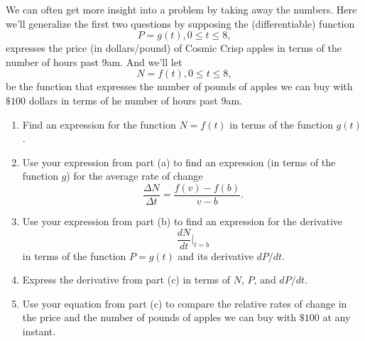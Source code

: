\documentclass{ximera}
\begin{document}
\begin{question}  \label{Qopdfpdsgnbhtr}
We can often get more insight into a problem by taking away the numbers. Here we'll generalize the first two questions by supposing the (differentiable) function
\[
         P = g(t) , 0\leq t \leq 8 ,
\]
expresses the price (in dollars/pound) of Cosmic Crisp apples in terms of the number of hours past 9am. And we'll let
\[
          N = f(t) , 0\leq t \leq 8 ,
\]
be the function that expresses the number of pounds of apples we can buy with $\$100$ dollars in terms of he number of hours past 9am.

\begin{enumerate}
\item Find an expression for the function $N=f(t)$ in terms of the function $g(t)$.

\item Use your expression from part (a) to find an expression (in terms of the function $g$) for the average rate of change
\[
 \frac{\Delta N}{\Delta t} = \frac{f(v)-f(b)}{v-b} .
\]

\item Use your expression from part (b) to find an expression for the derivative
\[
  \frac{dN}{dt}\Big|_{t=b} 
\]
in terms of the function $P=g(t)$ and its derivative $dP/dt$.

\item Express the derivative from part (c) in terms of $N$, $P$, and $dP/dt$.

\item Use your equation from part (c) to compare the  relative rates of change in the price and the number of pounds of apples we can buy with $\$100$ at any instant. 
\end{enumerate}

\end{question}
\end{document}
